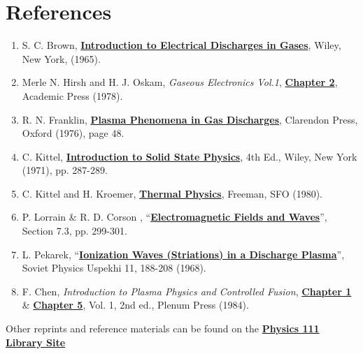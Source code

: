 \documentclass{../lab}
\begin{document}
\section{References}
\label{sec:References}

\begin{enumerate}
    \item S. C. Brown, \href{http://experimentationlab.berkeley.edu/sites/default/files/Electrical-Discharges-In-Gases.pdf}{\textbf{Introduction to Electrical Discharges in Gases}}, Wiley, New York, (1965).
    
    \item Merle N. Hirsh and H. J. Oskam, \emph{Gaseous Electronics Vol.1}, \href{http://physics111.lib.berkeley.edu/Physics111/Reprints/HAL/Gaseous\%20Electronics_HirshnOskam\%20ch2.pdf}{\textbf{Chapter 2}}, Academic Press (1978).
    

    \item R. N. Franklin, \href{http://physics111.lib.berkeley.edu/Physics111/Reprints/HAL/01-Plasma\_Phenomena\_in\_Gas\_Discharges.pdf}{\textbf{Plasma Phenomena in Gas Discharges}}, Clarendon Press, Oxford (1976), page 48.

    \item C. Kittel, \href{http://physics111.lib.berkeley.edu/Physics111/Reprints/HAL/02-Intro\_to\_Solid\_State\_Physics.pdf}{\textbf{Introduction to Solid State Physics}}, 4th Ed., Wiley, New York (1971), pp. 287-289.

    \item C. Kittel and H. Kroemer, \href{http://physics111.lib.berkeley.edu/Physics111/Reprints/HAL/Charles_Kittel-Herbert_Kroemer-Thermal_Physics.pdf}{\textbf{Thermal Physics}}, Freeman, SFO (1980).

    \item P. Lorrain \& R. D. Corson , ``\href{http://physics111.lib.berkeley.edu/Physics111/Reprints/HAL/03-Electromagnetic\_Field\_and\_Waves.pdf}{\textbf{Electromagnetic Fields and Waves}}'', Section 7.3, pp. 299-301.

    \item L. Pekarek, ``\href{http://physics111.lib.berkeley.edu/Physics111/Reprints/HAL/05-Ionization_Waves.pdf}{\textbf{Ionization Waves (Striations) in a Discharge Plasma}}'', Soviet Physics Uspekhi 11, 188-208 (1968).

    \item F. Chen, \emph{Introduction to Plasma Physics and Controlled Fusion}, \href{http://physics111.lib.berkeley.edu/Physics111/Reprints/HAL/06-Intro\_to\_Plasma\_Physics\_CH1.pdf}{\textbf{Chapter 1}} \& \href{http://physics111.lib.berkeley.edu/Physics111/Reprints/HAL/06-Intro\_to\_Plasma\_Physics\_CH5.pdf}{\textbf{Chapter 5}}, Vol. 1, 2nd ed., Plenum Press (1984).

\end{enumerate}

\noindent Other reprints and reference materials can be found on the \href{http://physics111.lib.berkeley.edu/Physics111/Reprints/HAL/HAL\_index.html}{\textbf{Physics 111 Library Site}}
\end{document}
